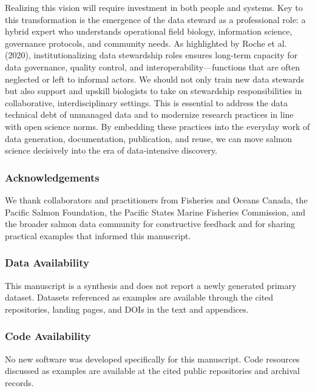 \documentclass[
  letterpaper,
  DIV=11,
  numbers=noendperiod]{scrartcl}
\begin{document}
Realizing this vision will require investment in both people and
systems. Key to this transformation is the emergence of the data steward
as a professional role: a hybrid expert who understands operational
field biology, information science, governance protocols, and community
needs. As highlighted by Roche et al. (2020), institutionalizing data
stewardship roles ensures long-term capacity for data governance,
quality control, and interoperability---functions that are often
neglected or left to informal actors. We should not only train new data
stewards but also support and upskill biologists to take on stewardship
responsibilities in collaborative, interdisciplinary settings. This is
essential to address the data technical debt of unmanaged data and to
modernize research practices in line with open science norms. By
embedding these practices into the everyday work of data generation,
documentation, publication, and reuse, we can move salmon science
decisively into the era of data-intensive discovery.

\subsubsection{Acknowledgements}\label{acknowledgements}

We thank collaborators and practitioners from Fisheries and Oceans
Canada, the Pacific Salmon Foundation, the Pacific States Marine
Fisheries Commission, and the broader salmon data community for
constructive feedback and for sharing practical examples that informed
this manuscript.

\subsubsection{Data Availability}\label{data-availability}

This manuscript is a synthesis and does not report a newly generated
primary dataset. Datasets referenced as examples are available through
the cited repositories, landing pages, and DOIs in the text and
appendices.

\subsubsection{Code Availability}\label{code-availability}

No new software was developed specifically for this manuscript. Code
resources discussed as examples are available at the cited public
repositories and archival records.
\end{document}
